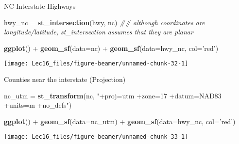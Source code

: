\documentclass[11pt,ignorenonframetext,]{beamer}
\newenvironment{Shaded}{}{}
\newcommand{\CommentTok}[1]{\textcolor[rgb]{0.38,0.63,0.69}{\textit{#1}}}
\newcommand{\DataTypeTok}[1]{\textcolor[rgb]{0.56,0.13,0.00}{#1}}
\newcommand{\KeywordTok}[1]{\textcolor[rgb]{0.00,0.44,0.13}{\textbf{#1}}}
\newcommand{\NormalTok}[1]{#1}
\newcommand{\OperatorTok}[1]{\textcolor[rgb]{0.40,0.40,0.40}{#1}}
\newcommand{\StringTok}[1]{\textcolor[rgb]{0.25,0.44,0.63}{#1}}
\let\oldShaded\Shaded
\let\endoldShaded\endShaded
\renewenvironment{Shaded}{\footnotesize\begin{spacing}{0.9}\oldShaded}{\endoldShaded\end{spacing}}
\let\oldverbatim\verbatim
\let\endoldverbatim\endverbatim
\newcommand{\scriptoutput}{
  \renewenvironment{Shaded}{\scriptsize\begin{spacing}{0.9}\oldShaded}{\endoldShaded\end{spacing}}
  \renewenvironment{verbatim}{\scriptsize\begin{spacing}{0.9}\oldverbatim}{\endoldverbatim\end{spacing}}
}
\begin{document}
\begin{frame}[fragile,t]{NC Interstate Highways}
\protect\hypertarget{nc-interstate-highways}{}

\scriptoutput

\begin{Shaded}
\begin{Highlighting}[]
\NormalTok{hwy_nc =}\StringTok{ }\KeywordTok{st_intersection}\NormalTok{(hwy, nc)}
\CommentTok{## although coordinates are longitude/latitude, st_intersection assumes that they are planar}

\KeywordTok{ggplot}\NormalTok{() }\OperatorTok{+}\StringTok{ }
\StringTok{  }\KeywordTok{geom_sf}\NormalTok{(}\DataTypeTok{data=}\NormalTok{nc) }\OperatorTok{+}
\StringTok{  }\KeywordTok{geom_sf}\NormalTok{(}\DataTypeTok{data=}\NormalTok{hwy_nc, }\DataTypeTok{col=}\StringTok{'red'}\NormalTok{)}
\end{Highlighting}
\end{Shaded}

\begin{center}\texttt{[image: Lec16\_files/figure-beamer/unnamed-chunk-32-1]} \end{center}

\end{frame}

\begin{frame}[fragile,t]{Counties near the interstate (Projection)}
\protect\hypertarget{counties-near-the-interstate-projection}{}

\scriptoutput

\begin{Shaded}
\begin{Highlighting}[]
\NormalTok{nc_utm  =}\StringTok{ }\KeywordTok{st_transform}\NormalTok{(nc, }\StringTok{"+proj=utm +zone=17 +datum=NAD83 +units=m +no_defs"}\NormalTok{)}

\KeywordTok{ggplot}\NormalTok{() }\OperatorTok{+}\StringTok{ }
\StringTok{  }\KeywordTok{geom_sf}\NormalTok{(}\DataTypeTok{data=}\NormalTok{nc_utm) }\OperatorTok{+}
\StringTok{  }\KeywordTok{geom_sf}\NormalTok{(}\DataTypeTok{data=}\NormalTok{hwy_nc, }\DataTypeTok{col=}\StringTok{'red'}\NormalTok{)}
\end{Highlighting}
\end{Shaded}

\begin{center}\texttt{[image: Lec16\_files/figure-beamer/unnamed-chunk-33-1]} \end{center}

\end{frame}
\end{document}
